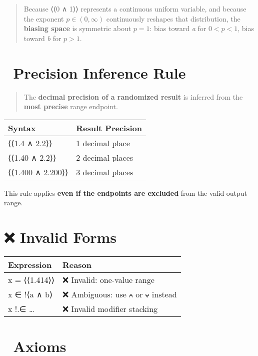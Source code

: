 \documentclass[
  letterpaper,
]{book}
\begin{document}
\begin{quote}
Because ⟨⟨0 ∧ 1⟩⟩ represents a continuous uniform variable, and because
the exponent \(p \in (0, \infty)\) continuously reshapes that
distribution, the \textbf{biasing space} is symmetric about \(p = 1\):
bias toward \emph{a} for \(0 < p < 1\), bias toward \emph{b} for
\(p > 1\).
\end{quote}

\section{🔬 Precision Inference Rule}\label{precision-inference-rule}

\begin{quote}
The \textbf{decimal precision of a randomized result} is inferred from
the \textbf{most precise} range endpoint.
\end{quote}

\begin{longtable}[]{@{}ll@{}}
\toprule\noalign{}
Syntax & Result Precision \\
\midrule\noalign{}
\endhead
\bottomrule\noalign{}
\endlastfoot
⟨⟨1.4 ∧ 2.2⟩⟩ & 1 decimal place \\
⟨⟨1.40 ∧ 2.2⟩⟩ & 2 decimal places \\
⟨⟨1.400 ∧ 2.200⟩⟩ & 3 decimal places \\
\end{longtable}

This rule applies \textbf{even if the endpoints are excluded} from the
valid output range.

\section{❌ Invalid Forms}\label{invalid-forms}

\begin{longtable}[]{@{}ll@{}}
\toprule\noalign{}
Expression & Reason \\
\midrule\noalign{}
\endhead
\bottomrule\noalign{}
\endlastfoot
x = ⟨⟨1.414⟩⟩ & ❌ Invalid: one-value range \\
x ∈ !⟨a ∧ b⟩ & ❌ Ambiguous: use \texttt{⩜} or \texttt{⩝} instead \\
x !.∈ \ldots{} & ❌ Invalid modifier stacking \\
\end{longtable}

\section{📜 Axioms}\label{axioms}
\end{document}
